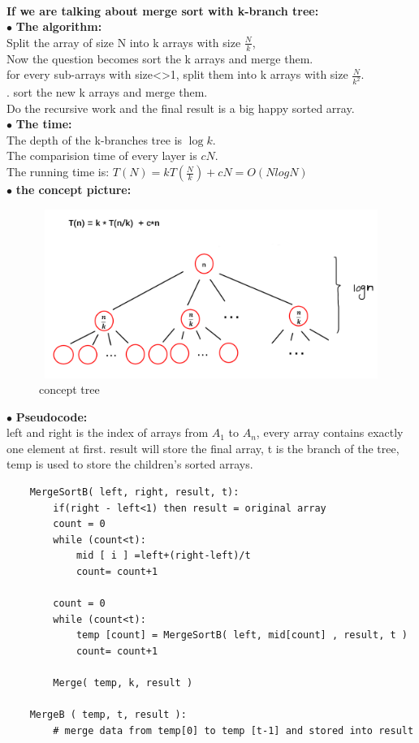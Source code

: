 \documentclass[12pt,a4paper]{article}
\newcommand{\question}[1]{\bigskip\noindent{\textbf{Q{#1} solution}}}
\begin{document}
\question{14.B}\\
\textbf{If we are talking about merge sort with k-branch tree:}\\
$\bullet$ \textbf{The algorithm:}\\
Split the array of size N into k arrays with size $\frac{N}{k}$,\\
Now the question becomes sort the k arrays and merge them.\\
for every sub-arrays with size<>1, split them into k arrays with size $\frac{N}{k^2}$.\\. sort the new k arrays and merge them.\\
Do the recursive work and the final result is a big happy sorted array.\\
$\bullet$ \textbf{The time:}\\
The depth of the k-branches tree is $\log{k}$.\\
The comparision time of every layer is $cN$.\\
The running time is: $T(N) = kT(\frac{N}{k})+cN = O(NlogN)$\\	
$\bullet$ \textbf{the concept picture:}\\
	\begin{figure}[H]
	\centering %
	\includegraphics[height=5.5cm,width=12.5cm]{picture//Q14B1.png}
	\caption{concept tree}
	\end{figure}

\noindent
$\bullet$ \textbf{Pseudocode:}\\
	left and right is the index of arrays from $A_1$ to $A_n$, every array contains exactly one element at first. result will store the final array, t is the branch of the tree, temp is used to store the children's sorted arrays.
	\begin{lstlisting}
	MergeSortB( left, right, result, t):
		if(right - left<1) then result = original array
		count = 0
		while (count<t):
			mid [ i ] =left+(right-left)/t
			count= count+1
		
		count = 0
		while (count<t):
			temp [count] = MergeSortB( left, mid[count] , result, t )
			count= count+1
	
		Merge( temp, k, result )
	
	MergeB ( temp, t, result ):
		# merge data from temp[0] to temp [t-1] and stored into result
	\end{lstlisting}
\end{document}
